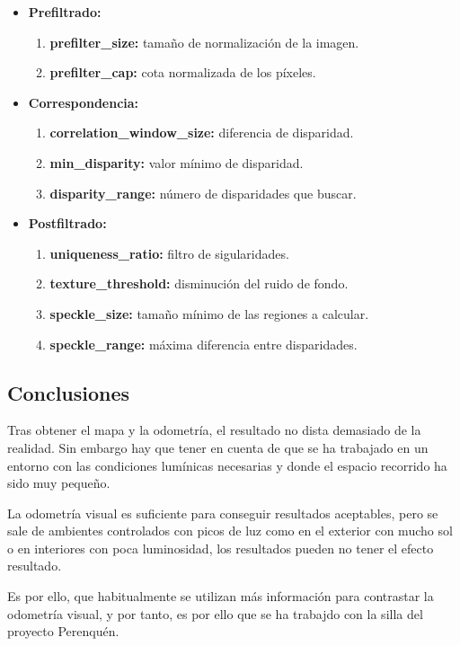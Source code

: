 \begin{itemize}
  \item \textbf{Prefiltrado:}
  \begin{enumerate}
    \item \textbf{prefilter\_size:} tamaño de normalización de la imagen.
    \item \textbf{prefilter\_cap:} cota normalizada de los píxeles.
  \end{enumerate}
  \item \textbf{Correspondencia:}
  \begin{enumerate}
    \item \textbf{correlation\_window\_size:} diferencia de disparidad. 
    \item \textbf{min\_disparity:} valor mínimo de disparidad.
    \item \textbf{disparity\_range:} número de disparidades que buscar.
  \end{enumerate}
  \item \textbf{Postfiltrado:}
  \begin{enumerate}
    \item \textbf{uniqueness\_ratio:} filtro de sigularidades.
    \item \textbf{texture\_threshold:} disminución del ruido de fondo.
    \item \textbf{speckle\_size:} tamaño mínimo de las regiones a calcular.
    \item \textbf{speckle\_range:} máxima diferencia entre disparidades.
  \end{enumerate}
\end{itemize}

\subsection{Conclusiones}

Tras obtener el mapa y la odometría, el resultado no dista demasiado de la
realidad. Sin embargo hay que tener en cuenta de que se ha trabajado en un
entorno con las condiciones lumínicas necesarias y donde el espacio recorrido ha
sido muy pequeño.

La odometría visual es suficiente para conseguir resultados aceptables, pero se
sale de ambientes controlados con picos de luz como en el exterior con mucho sol
o en interiores con poca luminosidad, los resultados pueden no tener el efecto
resultado.

Es por ello, que habitualmente se utilizan más información para contrastar la
odometría visual, y por tanto, es por ello que se ha trabajdo con la silla del
proyecto Perenquén.


